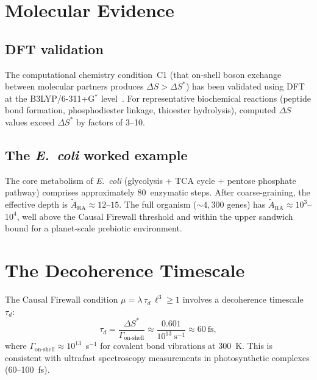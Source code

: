 \documentclass[11pt,a4paper]{article}
\theoremstyle{plain}
\theoremstyle{definition}
\theoremstyle{remark}
\begin{document}
\section{Molecular Evidence}\label{sec:molecular}

\subsection{DFT validation}\label{sec:dft}

The computational chemistry condition~C1 (that on-shell boson exchange between
molecular partners produces $\Delta S > \Delta S^*$) has been validated using DFT at
the B3LYP/6-311+G$^*$ level~\cite{RACF2026}.  For representative biochemical
reactions (peptide bond formation, phosphodiester linkage, thioester hydrolysis),
computed $\Delta S$ values exceed $\Delta S^*$ by factors of 3--10.

\subsection{The \emph{E.~coli} worked example}\label{sec:ecoli}

The core metabolism of \emph{E.~coli} (glycolysis + TCA cycle + pentose phosphate
pathway) comprises approximately 80~enzymatic steps.  After coarse-graining, the
effective depth is $\tilde{A}_{\mathrm{RA}} \approx 12$--$15$.  The full organism
($\sim\!4{,}300$ genes) has $\tilde{A}_{\mathrm{RA}} \approx 10^3$--$10^4$, well
above the Causal Firewall threshold and within the upper sandwich bound for a
planet-scale prebiotic environment.

\section{The Decoherence Timescale}\label{sec:decoherence}

The Causal Firewall condition $\mu = \lambda\,\tau_d\,\ell^3 \geq 1$ involves a
decoherence timescale~$\tau_d$:
\begin{equation}
\tau_d = \frac{\Delta S^*}{\Gamma_{\mathrm{on\text{-}shell}}}
\approx \frac{0.601}{10^{13}~\mathrm{s}^{-1}} \approx 60~\mathrm{fs},
\label{eq:tau}
\end{equation}
where $\Gamma_{\mathrm{on\text{-}shell}} \approx 10^{13}$~s$^{-1}$ for covalent
bond vibrations at 300~K.  This is consistent with ultrafast spectroscopy
measurements in photosynthetic complexes (60--100~fs).
\end{document}
